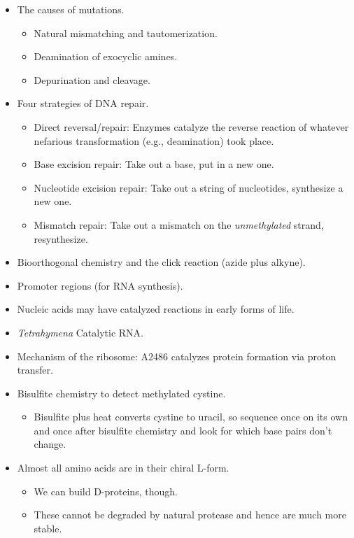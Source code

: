 \documentclass[../notes.tex]{subfiles}
\begin{document}
\begin{itemize}
\begin{itemize}
    \end{itemize}
    \item The causes of mutations.
    \begin{itemize}
        \item Natural mismatching and tautomerization.
        \item Deamination of exocyclic amines.
        \item Depurination and cleavage.
    \end{itemize}
    \item Four strategies of DNA repair.
    \begin{itemize}
        \item Direct reversal/repair: Enzymes catalyze the reverse reaction of whatever nefarious transformation (e.g., deamination) took place.
        \item Base excision repair: Take out a base, put in a new one.
        \item Nucleotide excision repair: Take out a string of nucleotides, synthesize a new one.
        \item Mismatch repair: Take out a mismatch on the \emph{unmethylated} strand, resynthesize.
    \end{itemize}
    \item Bioorthogonal chemistry and the click reaction (azide plus alkyne).
    \item Promoter regions (for RNA synthesis).
    \item Nucleic acids may have catalyzed reactions in early forms of life.
    \item \emph{Tetrahymena} Catalytic RNA.
    \item Mechanism of the ribosome: A2486 catalyzes protein formation via proton transfer.
    \item Bisulfite chemistry to detect methylated cystine.
    \begin{itemize}
        \item Bisulfite plus heat converts cystine to uracil, so sequence once on its own and once after bisulfite chemistry and look for which base pairs don't change.
    \end{itemize}
    \item Almost all amino acids are in their chiral L-form.
    \begin{itemize}
        \item We can build D-proteins, though.
        \item These cannot be degraded by natural protease and hence are much more stable.

\end{itemize}
\end{itemize}
\end{document}
